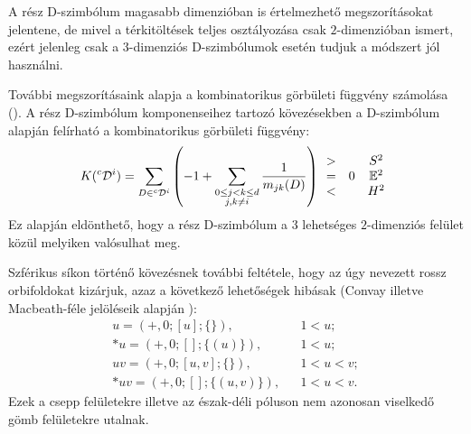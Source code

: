 \documentclass[12pt,magyar,a4paper]{article}
\newcommand{\leftexp}[2]{{\vphantom{#2}}^{#1}{#2}}
\begin{document}
A rész D-szimbólum magasabb dimenzióban is értelmezhető megszorításokat
jelentene, de mivel a térkitöltések teljes osztályozása csak $2$-dimenzióban
ismert, ezért jelenleg csak a $3$-dimenziós D-szimbólumok esetén tudjuk a
módszert jól használni.

További megszorításaink alapja a kombinatorikus görbületi függvény számolása
(\cite{Emil}). A rész D-szimbólum komponenseihez tartozó kövezésekben a
D-szimbólum alapján felírható a kombinatorikus görbületi függvény:
\begin{align*}
  K(\leftexp{c}{\mathcal{D}}^i)=\sum_{D\in
  \leftexp{c}{\mathcal{D}}^i}\left(-1+\sum_{\substack{0\le j<k\le d \\
  j,k\ne i}}\frac{1}{m_{jk}(D)}\right)
  \begin{array}{cccc}
    > & & S^2 \\
    = & 0 & \mathbb{E}^2 \\
    < & & H^2
  \end{array}
\end{align*}
Ez alapján eldönthető, hogy a rész D-szimbólum a 3 lehetséges $2$-dimenziós
felület közül melyiken valósulhat meg.

Szférikus síkon történő kövezésnek további feltétele, hogy az úgy nevezett
rossz orbifoldokat kizárjuk, azaz a következő lehetőségek hibásak (Convay
illetve Macbeath-féle jelöléseik alapján \cite{CM}):
\begin{align*}
  u=(+,0;[u];\{\}), & & 1<u;\\
  *u=(+,0;[];\{(u)\}), & & 1<u;\\
  uv=(+,0;[u,v];\{\}), & & 1<u<v;\\
  *uv=(+,0;[];\{(u,v)\}), & & 1<u<v.
\end{align*}
Ezek a csepp felületekre illetve az észak-déli póluson nem azonosan viselkedő
gömb felületekre utalnak.
\end{document}
